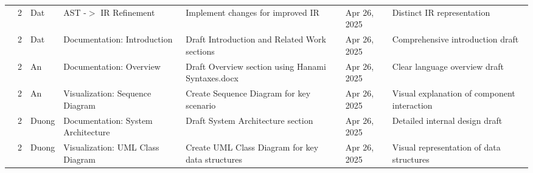 \documentclass[11pt]{article}
\begin{document}
\begin{longtable}{|p{}|p{}|p{}|p{}|p{}|p{}|p{}|}
\rowcolor{week3color} 
& 2& Dat & AST -$>$ IR Refinement & Implement changes for improved IR & Apr 26, 2025 & Distinct IR representation \\
\rowcolor{week3color} 
& 2& Dat & Documentation: Introduction & Draft Introduction and Related Work sections & Apr 26, 2025 & Comprehensive introduction draft \\
\rowcolor{week3color} 
&2 & An & Documentation: Overview & Draft Overview section using Hanami Syntaxes.docx & Apr 26, 2025 & Clear language overview draft \\
\rowcolor{week3color} 
& 2& An & Visualization: Sequence Diagram & Create Sequence Diagram for key scenario & Apr 26, 2025 & Visual explanation of component interaction \\
\rowcolor{week3color} 
& 2& Duong & Documentation: System Architecture & Draft System Architecture section & Apr 26, 2025 & Detailed internal design draft \\
\rowcolor{week3color} 
& 2& Duong & Visualization: UML Class Diagram & Create UML Class Diagram for key data structures & Apr 26, 2025 & Visual representation of data structures \\
\hline


\end{longtable}
\end{document}
